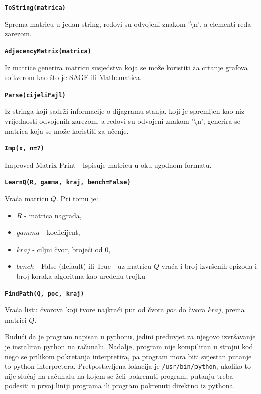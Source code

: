 \documentclass[    DIV=calc, paper=a4,fontsize=11pt, twocolumn]{scrartcl}                     %
\begin{document}
\vspace{0.4cm}
\noindent\textbf{\texttt{ToString(matrica)}}

   Sprema matricu u jedan string, redovi su odvojeni znakom '\textbackslash n', 
   a elementi reda zarezom.
   
\vspace{0.4cm}
\noindent\textbf{\texttt{AdjacencyMatrix(matrica)}}

    Iz matrice generira matricu susjedstva koja se može koristiti za crtanje grafova softverom kao što je SAGE ili Mathematica.

\vspace{0.4cm}
\noindent\textbf{\texttt{Parse(cijeliFajl)}}

    Iz stringa koji sadrži informacije o dijagramu stanja, koji je spremljen kao niz vrijednosti odvojenih zarezom, a redovi su odvojeni znakom '\textbackslash n', 
    generira se matrica koja se može koristiti za učenje.

\vspace{0.4cm}
\noindent\textbf{\texttt{Imp(x, n=7)}}

    Improved Matrix Print - Ispisuje matricu u oku ugodnom formatu.

\vspace{0.4cm}
\noindent\textbf{\texttt{LearnQ(R, gamma, kraj, bench=False)}}

    Vraća matricu $Q$. Pri tomu je:
\begin{itemize}
\item    $R$     - matrica nagrada,
\item    $gamma$ - koeficijent,
\item    $kraj$  - ciljni čvor, brojeći od 0,
\item    $bench$ - False (default) ili True - uz matricu $Q$ vraća i broj izvršenih epizoda i broj koraka algoritma kao uređenu trojku
\end{itemize}

\vspace{0.4cm}
\noindent\textbf{\texttt{FindPath(Q, poc, kraj)}}

    Vraća listu čvorova koji tvore najkraći put od čvora $poc$ do čvora $kraj$, prema matrici $Q$.
    
\vspace{0.4cm}
Budući da je program napisan u pythonu, jedini preduvjet za njegovo izvršavanje je instaliran python na računalu.
Nadalje, program nije kompiliran u strojni kod nego se prilikom pokretanja interpretira, pa program mora biti
svjestan putanje to python interpretera. Pretpostavljena lokacija je \texttt{/usr/bin/python}, ukoliko to nije slučaj na
računalu na kojem se želi pokrenuti program, putanju treba podesiti u prvoj liniji programa ili program pokrenuti direktno iz
pythona.
\end{document}
